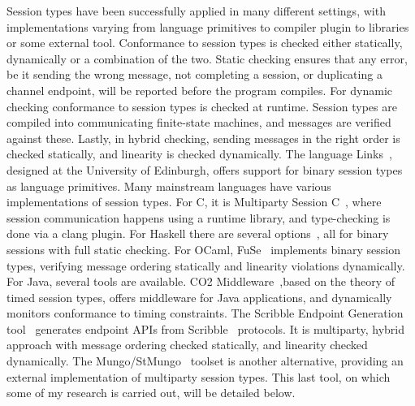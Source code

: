Session types have been successfully applied in many different settings, with implementations varying from language primitives to compiler plugin to libraries or some external tool. Conformance to session types is checked either statically, dynamically or a combination of the two. Static checking ensures that any error, be it sending the wrong message, not completing a session, or duplicating a channel endpoint, will be reported before the program compiles. For dynamic checking conformance to session types is checked at runtime. Session types are compiled into communicating finite-state machines, and messages are verified against these. Lastly, in hybrid checking, sending messages in the right order is checked statically, and linearity is checked dynamically. The language Links~\cite{lindley2017lightweight}, designed at the University of Edinburgh, offers support for binary session types as language primitives.
Many mainstream languages have various implementations of session types. For C, it is Multiparty Session C~\cite{ng2010high, ng2012session}, where session communication happens using a runtime library, and type-checking is done via a clang plugin. For Haskell there are several options~\cite{lindley2016embedding,sackman2008session,orchard2016effects}, all for binary sessions with full static checking. For OCaml, FuSe~\cite{padovani2017simple} implements binary session types, verifying message ordering statically and linearity violations dynamically.
For Java, several tools are available. CO2 Middleware~\cite{bartoletti2015contract, bartoletti2015compliance},based on the theory of timed session types, offers middleware for Java applications, and dynamically monitors conformance to timing constraints.
The Scribble Endpoint Generation tool~\cite{hu2016hybrid} generates endpoint APIs from Scribble~\cite{YHNN2013} protocols. It is multiparty, hybrid approach with message ordering checked statically, and linearity checked dynamically.
The Mungo/StMungo~\cite{kouzapas16, dardha2017mungo} toolset is another alternative, providing an external implementation of multiparty session types.
This last tool, on which some of my research is carried out, will be detailed below.


